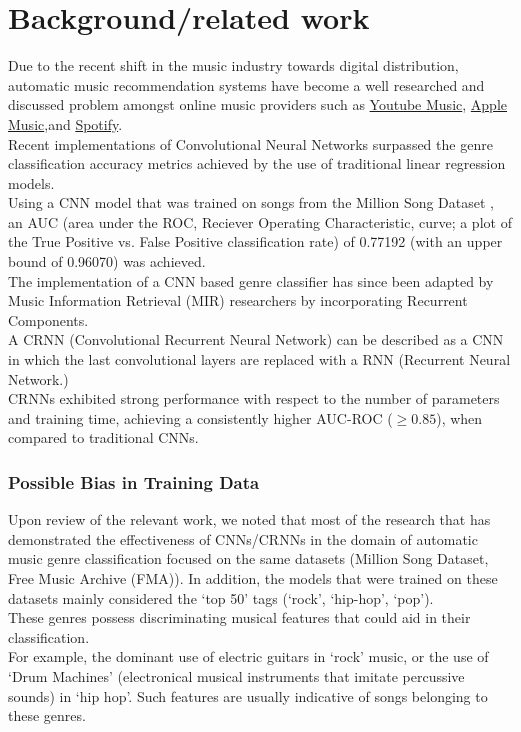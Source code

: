\documentclass[12pt]{article}
\newcounter{ct}
\begin{document}
\section*{Background/related work}
Due to the recent shift in the music industry towards digital distribution,
automatic music recommendation systems have become a well 
researched and discussed
problem amongst online music providers such as 
\href{https://www.youtube.com/musicpremium}
{Youtube Music}, 
\href{https://www.apple.com/music/}
{Apple Music},and 
\href{https://www.spotify.com/}{Spotify}.\\
Recent implementations of Convolutional Neural Networks 
surpassed the genre classification accuracy metrics achieved  
by the use of traditional linear regression models.\cite{c4} \\ Using a CNN 
model that was trained on songs from the 
Million Song Dataset \cite{c5}, an AUC (area under the ROC, 
Reciever Operating Characteristic, curve; a plot of the True Positive
vs.
False Positive classification rate) of 0.77192 (with an upper bound of
0.96070) was achieved. \cite{c4}\\
The implementation of a CNN based genre classifier 
has since been adapted by 
Music Information Retrieval (MIR) 
researchers by incorporating Recurrent Components.\\
A CRNN (Convolutional Recurrent Neural Network) can be described
as a CNN in which the last convolutional layers are replaced
with a RNN (Recurrent Neural Network.)\\
CRNNs exhibited
strong performance with respect to the number of parameters 
and training time, achieving a consistently higher
AUC-ROC ($\ge 0.85$), when compared to traditional CNNs.\cite{c6}

\subsubsection*{Possible Bias in Training Data}
Upon review of the relevant work, we noted that most of the 
research that has demonstrated the effectiveness of CNNs/CRNNs 
in the domain of automatic music genre
classification focused on the same datasets (Million Song Dataset, 
Free Music Archive (FMA))\cite{c7}. 
In addition, the models that were trained
on these datasets mainly considered the `top 50' tags (`rock',
`hip-hop', `pop').\\
These genres possess
discriminating musical features that could aid in their classification.\\
For example, the dominant use of electric guitars in `rock' music, 
or the use of `Drum Machines' (electronical musical instruments
that imitate percussive sounds) in `hip hop'. Such features are 
usually indicative 
of songs belonging to these genres.
\end{document}
